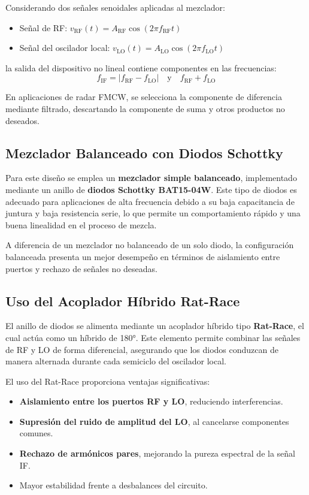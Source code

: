Considerando dos señales senoidales aplicadas al mezclador:
\begin{itemize}
    \item Señal de RF: $v_{\text{RF}}(t) = A_{\text{RF}} \cos(2\pi f_{\text{RF}} t)$
    \item Señal del oscilador local: $v_{\text{LO}}(t) = A_{\text{LO}} \cos(2\pi f_{\text{LO}} t)$
\end{itemize}

\noindent la salida del dispositivo no lineal contiene componentes en las frecuencias:
\begin{equation}
    f_{\text{IF}} = \left| f_{\text{RF}} - f_{\text{LO}} \right| \quad \text{y} \quad f_{\text{RF}} + f_{\text{LO}}
\end{equation}

En aplicaciones de radar FMCW, se selecciona la componente de diferencia mediante filtrado, descartando la componente de suma y otros productos no deseados. 

\subsection{Mezclador Balanceado con Diodos Schottky }

Para este diseño se emplea un \textbf{mezclador simple balanceado}, implementado mediante un anillo de \textbf{diodos Schottky BAT15-04W}. Este tipo de diodos es adecuado para aplicaciones de alta frecuencia debido a su baja capacitancia de juntura y baja resistencia serie, lo que permite un comportamiento rápido y una buena linealidad en el proceso de mezcla.

A diferencia de un mezclador no balanceado de un solo diodo, la configuración balanceada presenta un mejor desempeño en términos de aislamiento entre puertos y rechazo de señales no deseadas.

\subsection{Uso del Acoplador Híbrido Rat-Race }

El anillo de diodos se alimenta mediante un acoplador híbrido tipo \textbf{Rat-Race}, el cual actúa como un híbrido de 180°. Este elemento permite combinar las señales de RF y LO de forma diferencial, asegurando que los diodos conduzcan de manera alternada durante cada semiciclo del oscilador local.

El uso del Rat-Race proporciona ventajas significativas:
\begin{itemize}
    \item \textbf{Aislamiento entre los puertos RF y LO}, reduciendo interferencias.
    \item \textbf{Supresión del ruido de amplitud del LO}, al cancelarse componentes comunes.
    \item \textbf{Rechazo de armónicos pares}, mejorando la pureza espectral de la señal IF.
    \item Mayor estabilidad frente a desbalances del circuito.
\end{itemize}

